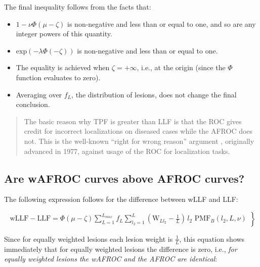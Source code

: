 \documentclass[
]{book}
\providecommand{\tightlist}{%
  \setlength{\itemsep}{0pt}\setlength{\parskip}{0pt}}
\begin{document}
The final inequality follows from the facts that:

\begin{itemize}
\tightlist
\item
  \(1 - \nu \Phi \left ( \mu - \zeta \right )\) is non-negative and less than or equal to one, and so are any integer powers of this quantity.
\item
  \(\text{exp}\left ( - \lambda \Phi \left ( - \zeta \right )\right )\) is non-negative and less than or equal to one.
\item
  The equality is achieved when \(\zeta = +\infty\), i.e., at the origin (since the \(\Phi\) function evaluates to zero).
\item
  Averaging over \(f_L\), the distribution of lesions, does not change the final conclusion.
\end{itemize}

\begin{quote}
The basic reason why TPF is greater than LLF is that the ROC gives credit for incorrect localizations on diseased cases while the AFROC does not. This is the well-known ``right for wrong reason'' argument \citep{bunch1977free}, originally advanced in 1977, against usage of the ROC for localization tasks.
\end{quote}

\hypertarget{rsm-other-predictions-wafroc-above-afroc}{%
\subsection{Are wAFROC curves above AFROC curves?}\label{rsm-other-predictions-wafroc-above-afroc}}

The following expression follows for the difference between wLLF and LLF:

\begin{equation} 
\left.
\begin{aligned}
\text{wLLF}-\text{LLF}
= \Phi\left ( \mu - \zeta \right )\sum_{L=1}^{L_{max}} f_L  \sum_{l_2=1}^{L} \left( \text{W}_{Ll_2} -\frac{1}{L} \right) \, l_2 \,\,  \text{PMF}_{B}\left ( l_2, L, \nu \right )
\end{aligned}
\right \}
\label{eq:rsm-other-predictions-wllf-llf}
\end{equation}

Since for equally weighted lesions each lesion weight is \(\frac{1}{L}\), this equation shows immediately that for equally weighted lesions the difference is zero, i.e., \emph{for equally weighted lesions the wAFROC and the AFROC are identical}:
\end{document}
